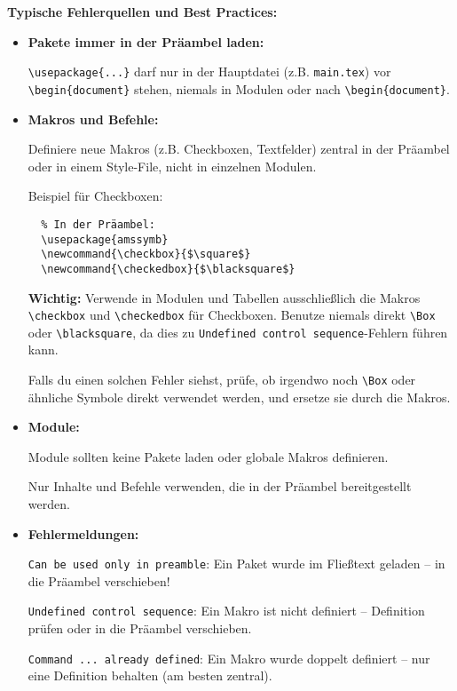 \textbf{Typische Fehlerquellen und Best Practices:}

\begin{itemize}
\tightlist
\item
  \textbf{Pakete immer in der Präambel laden:}
  
  \texttt{\textbackslash{}usepackage\{...\}} darf nur in der Hauptdatei (z.B. \texttt{main.tex}) vor \texttt{\textbackslash{}begin\{document\}} stehen, niemals in Modulen oder nach \texttt{\textbackslash{}begin\{document\}}.
\item
  \textbf{Makros und Befehle:}
  
  Definiere neue Makros (z.B. Checkboxen, Textfelder) zentral in der Präambel oder in einem Style-File, nicht in einzelnen Modulen.
  
  Beispiel für Checkboxen:
  \begin{verbatim}
  % In der Präambel:
  \usepackage{amssymb}
  \newcommand{\checkbox}{$\square$}
  \newcommand{\checkedbox}{$\blacksquare$}
  \end{verbatim}
  
  \textbf{Wichtig:} Verwende in Modulen und Tabellen ausschließlich die Makros \texttt{\textbackslash{}checkbox} und \texttt{\textbackslash{}checkedbox} für Checkboxen. Benutze niemals direkt \texttt{\textbackslash{}Box} oder \texttt{\textbackslash{}blacksquare}, da dies zu \texttt{Undefined control sequence}-Fehlern führen kann.
  
  Falls du einen solchen Fehler siehst, prüfe, ob irgendwo noch \texttt{\textbackslash{}Box} oder ähnliche Symbole direkt verwendet werden, und ersetze sie durch die Makros.
\item
  \textbf{Module:}
  
  Module sollten keine Pakete laden oder globale Makros definieren.
  
  Nur Inhalte und Befehle verwenden, die in der Präambel bereitgestellt werden.
\item
  \textbf{Fehlermeldungen:}
  
  \texttt{Can be used only in preamble}: Ein Paket wurde im Fließtext geladen -- in die Präambel verschieben!
  
  \texttt{Undefined control sequence}: Ein Makro ist nicht definiert -- Definition prüfen oder in die Präambel verschieben.
  
  \texttt{Command ... already defined}: Ein Makro wurde doppelt definiert -- nur eine Definition behalten (am besten zentral).
\end{itemize}

